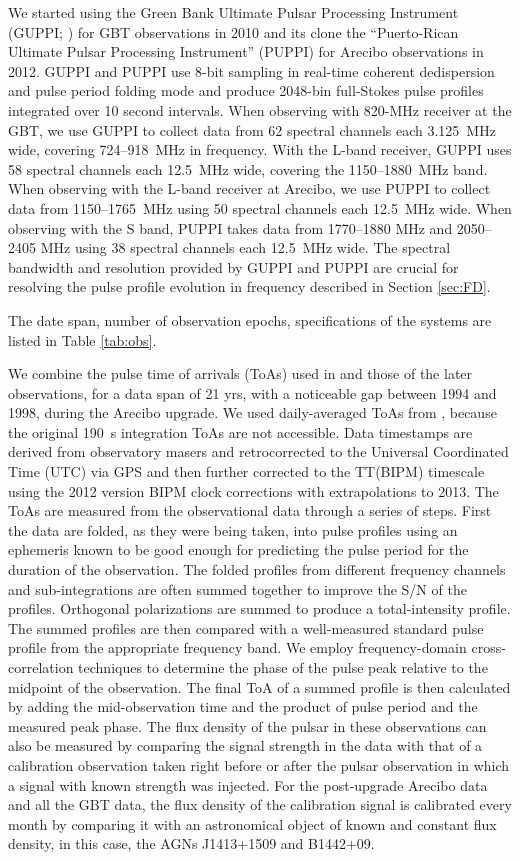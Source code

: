 We started using 
the Green Bank Ultimate Pulsar Processing Instrument (GUPPI; \citealt{GUPPI}) for GBT 
observations in 2010 and its clone the ``Puerto-Rican Ultimate Pulsar Processing Instrument''
(PUPPI) for Arecibo observations in 2012. 
GUPPI and PUPPI use 8-bit sampling in real-time coherent dedispersion and
pulse period folding mode and produce 2048-bin full-Stokes
pulse profiles integrated over 10 second intervals.
When observing with 820-MHz receiver at the GBT, we use GUPPI to collect data from 62 spectral 
channels each 3.125~MHz wide, covering 724--918~MHz in frequency. With the L-band receiver, GUPPI
uses 58 spectral channels each 12.5~MHz wide, covering the 1150--1880~MHz band. 
When observing with the L-band receiver at Arecibo, we use PUPPI to collect data
from 1150--1765~MHz using 50 spectral channels each 12.5~MHz wide. When observing with the S band,
PUPPI takes data from 1770--1880 MHz and 2050--2405 MHz using 38 spectral
channels each 12.5~MHz wide.
The spectral bandwidth and resolution provided by GUPPI and PUPPI are crucial for resolving the pulse profile evolution in frequency described in Section \ref{sec:FD}.

The date span, number of observation epochs, specifications of the
systems are listed in Table \ref{tab:obs}. 

We combine the pulse time of arrivals (ToAs) used in \citealt{sns+05} and those
of the later observations, for a data span of 21 yrs, with a
noticeable gap between 1994 and 1998, during the Arecibo upgrade.
We used daily-averaged ToAs from \citealt{sns+05}, because the original 190~s integration ToAs are not accessible.
Data timestamps are derived from observatory masers and retrocorrected
to the Universal Coordinated Time (UTC) via GPS and then further
corrected to the TT(BIPM) timescale using the 2012 version BIPM clock corrections with extrapolations to 2013.
The ToAs are measured from the observational data through a series of
steps. First the data are folded, as they were being taken, into pulse
profiles using an ephemeris known to be good enough for predicting the
pulse period for the duration of the observation. The folded
profiles from different frequency channels and sub-integrations are
often summed together to improve the S/N of the profiles.  Orthogonal
polarizations are summed to produce a total-intensity profile.
The summed profiles are then compared with a well-measured standard
pulse profile from the appropriate frequency band. We employ
frequency-domain cross-correlation techniques \citep{tay92} to determine the phase of the pulse peak relative to the midpoint of the observation. The final ToA of a summed profile is then calculated by adding the mid-observation time and the product of pulse period and the measured peak phase.
The flux density of the pulsar in these observations can also be
measured by comparing the signal strength in the data with that of a
calibration observation taken right before or after the pulsar
observation in which a signal with known strength was injected. For
the post-upgrade Arecibo data and all the GBT data, the
flux density of the calibration signal is calibrated every month by
comparing it with an astronomical object of known and constant flux
density, in this case, the AGNs J1413+1509 and B1442+09.


